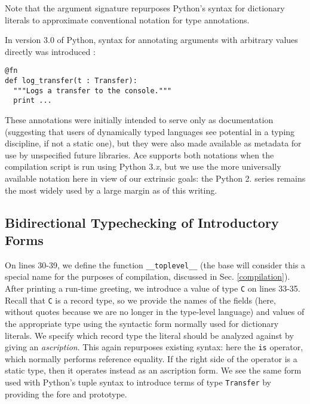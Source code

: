 Note that the argument signature repurposes Python's syntax for dictionary literals to approximate  conventional notation for type annotations.
 {In version 3.0 of Python, syntax for annotating arguments with arbitrary values directly was introduced \cite{pep3107}:
\begin{lstlisting}[numbers=none]
@fn
def log_transfer(t : Transfer): 
  """Logs a transfer to the console."""
  print ...
\end{lstlisting}
These annotations were initially intended to serve only as documentation (suggesting that users of dynamically typed languages see potential in a typing discipline, if not a static one), but they were also made available as metadata for use by unspecified  future libraries. Ace supports both notations when the compilation script is run using Python 3.\textit{x}, but we use the more universally available notation here in view of our extrinsic goals: the Python 2. series  remains the most widely used by a large margin as of this writing.%

\subsection{Bidirectional Typechecking of Introductory Forms}
On lines 30-39, we define the function \verb|__toplevel__| (the base will consider this a special name for the purposes of compilation, discussed in Sec. \ref{compilation}). After printing a run-time greeting, we introduce a value of type \verb|C| on lines 33-35. Recall that \verb|C| is a record type, so we provide the names of the fields (here, without quotes because we are no longer in the type-level language) and values of the appropriate type using the syntactic form normally used for dictionary literals. We specify which record type the literal should be {analyzed} against by giving an \emph{ascription}. This again repurposes existing  syntax: here the \verb|is| operator, which normally performs reference equality. If the right side of the operator is a static type, then it operates instead as an ascription form. We see the same form used with Python's tuple syntax to introduce terms of type \verb|Transfer| by providing the fore and prototype.

}
